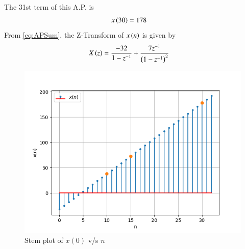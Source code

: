 \documentclass[journal,12pt,twocolumn]{IEEEtran}
\theoremstyle{remark}
\begin{document}
The 31st term of this A.P. is 
\begin{align}x\left(30\right)&=178\end{align}
 From \eqref{eq:APSum}, the Z-Transform of $x\left(n\right)$ is given by 
\begin{align}
    X\left(z\right)&=\frac{-32}{1-z^{-1}}+\frac{7z^{-1}}{\left(1-z^{-1}\right)^2}
\end{align}
 \begin{figure}[h]
    \centering
    \includegraphics[width=\columnwidth]{figs/fig1.png}
    \caption{Stem plot of $x(0)$ v/s $n$}
 \end{figure}
\end{document}

